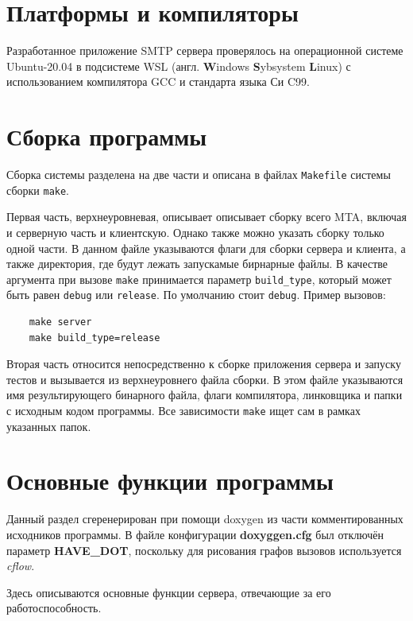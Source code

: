 \documentclass[a4paper,12pt]{report}
\begin{document}
\section{Платформы и компиляторы}

Разработанное приложение SMTP сервера проверялось на операционной системе Ubuntu-20.04 в подсистеме WSL (англ. \textbf{W}indows \textbf{S}ybsystem \textbf{L}inux) с использованием компилятора GCC и стандарта языка Си C99.


\section{Сборка программы}

Сборка системы разделена на две части и описана в файлах \texttt{Makefile} системы сборки \texttt{make}.

Первая часть, верхнеуровневая, описывает описывает сборку всего MTA, включая и серверную часть и клиентскую. Однако также можно указать сборку только одной части. В данном файле указываются флаги для сборки сервера и клиента, а также директория, где будут лежать запускамые бирнарные файлы. В качестве аргумента при вызове \texttt{make} принимается параметр \texttt{build\_type}, который может быть равен \texttt{debug} или \texttt{release}. По умолчанию стоит \texttt{debug}. Пример вызовов:
\begin{verbatim}
    make server
    make build_type=release
\end{verbatim}

Вторая часть относится непосредственно к сборке приложения сервера и запуску тестов и вызывается из верхнеуровнего файла сборки. В этом файле указываются имя результирующего бинарного файла, флаги компилятора, линковщика и папки с исходным кодом программы. Все зависимости \texttt{make} ищет сам в рамках указанных папок.


\section{Основные функции программы}

Данный раздел сгеренерирован при помощи doxygen из части комментированных исходников программы. В файле конфигурации \textbf{doxyggen.cfg} был отключён параметр \textbf{HAVE\_DOT}, поскольку для рисования графов вызовов используется \textit{cflow}.

Здесь описываются основные функции сервера, отвечающие за его работоспособность.



\end{document}
